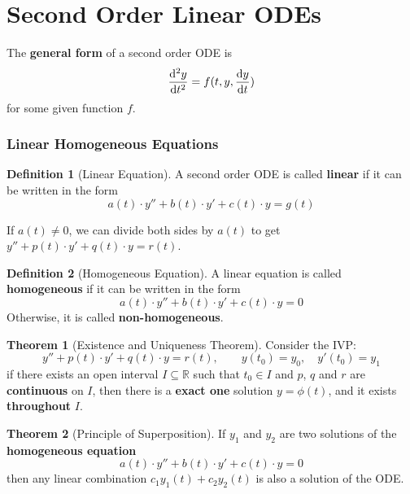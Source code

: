\documentclass[10pt,UTF8]{article}
\newenvironment{definitionBox}
{
  \begin{tcolorbox}[colback=blue!5!white,colframe=blue!75!black,parbox=false,before
  upper=\par,before lower=\par]}
  {
\end{tcolorbox}}
\newenvironment{theoremBox}
{
  \begin{tcolorbox}[colback=yellow!5!white,colframe=yellow!75!black,parbox=false,before
  upper=\par,before lower=\par]}
  {
\end{tcolorbox}}
\theoremstyle{definition}
\newtheorem{definition inner}{Definition}[section]
\newenvironment{definition}[1][]
{
  \begin{definitionBox}
  \begin{definition inner}[#1]\hfill\par}
    {
    \end{definition inner}
\end{definitionBox}}
\theoremstyle{definition}
\newtheorem{theorem inner}{Theorem}[section]
\newenvironment{theorem}[1][]
{
  \begin{theoremBox}
  \begin{theorem inner}[#1]\hfill\par}
    {
    \end{theorem inner}
\end{theoremBox}}
\theoremstyle{definition}
\newtheorem*{proof inner}{\textit{Proof}}
\theoremstyle{plain}
\newtheorem{tip inner}{Tip}[section]
\theoremstyle{remark}
\begin{document}
\part*{Second Order Linear ODEs}

The \textbf{general form} of a second order ODE is
\[
  \dv[2]{y}{t} = f(t,y,\dv{y}{t})
\]
for some given function \(f\).

\section{Linear Homogeneous Equations}

\begin{definition}[Linear Equation]
  A second order ODE is called \textbf{linear}
  if it can be written in the form
  \[
    a(t)\cdot y'' + b(t)\cdot y' + c(t)\cdot y = g(t)
  \]
\end{definition}

If \(a(t) \neq 0\), we can divide both sides by \(a(t)\) to get
\( y'' + p(t)\cdot y' + q(t)\cdot y = r(t) \).

\begin{definition}[Homogeneous Equation]
  A linear equation is called \textbf{homogeneous}
  if it can be written in the form
  \[
    a(t)\cdot y'' + b(t)\cdot y' + c(t)\cdot y = 0
  \]
  Otherwise, it is called \textbf{non-homogeneous}.
\end{definition}

\begin{theorem}[Existence and Uniqueness Theorem]
  {}\label{thm: Existence and Uniqueness Theorem}
  Consider the IVP\@:
  \begin{equation*}
    y'' + p(t)\cdot y' + q(t)\cdot y = r(t),
    \qquad y(t_0) = y_0, \quad y'(t_0) = y_1
  \end{equation*}
  if there exists an open interval \(I \subseteq \mathbb{R}\)
  such that \(t_0 \in I\) and \(p\), \(q\) and \(r\)
  are \textbf{continuous} on \(I\),
  then there is a \textbf{exact one} solution \(y = \phi(t)\),
  and it exists \textbf{throughout} \(I\).
\end{theorem}

\begin{theorem}[Principle of Superposition]
  {}\label{thm: Principle of Superposition}
  If \(y_1\) and \(y_2\) are two solutions of the \textbf{homogeneous equation}
  \[
    a(t)\cdot y'' + b(t)\cdot y' + c(t)\cdot y = 0
  \]
  then any linear combination \(c_1 y_1(t) + c_2 y_2(t)\)
  is also a solution of the ODE\@.
\end{theorem}
\end{document}
